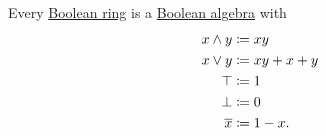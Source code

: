\begin{proposition}\label{thm:boolean_ring_as_algebra}
  Every \hyperref[def:boolean_ring]{Boolean ring} is a \hyperref[def:boolean_algebra]{Boolean algebra} with
  \begin{align}
    x \wedge y &\coloneqq xy         \label{eq:thm:boolean_ring_as_algebra/meet} \\
    x \vee y   &\coloneqq xy + x + y \label{eq:thm:boolean_ring_as_algebra/join} \\
    \top       &\coloneqq 1          \label{eq:thm:boolean_ring_as_algebra/top} \\
    \bot       &\coloneqq 0          \label{eq:thm:boolean_ring_as_algebra/bot} \\
    \oline{x}  &\coloneqq 1 - x      \label{eq:thm:boolean_ring_as_algebra/complement}.
  \end{align}
\end{proposition}
